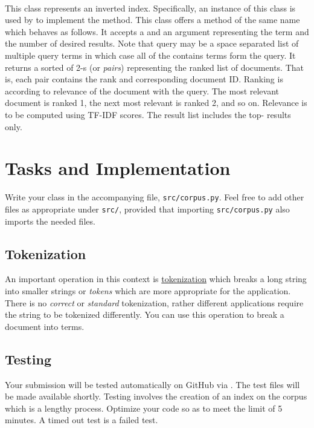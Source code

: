 \documentclass[addpoints]{exam}
\begin{document}
\paragraph{} This class represents an inverted index. Specifically, an instance of this class is used by  to implement the  method. This class offers a method of the same name which behaves as follows. It accepts a  and an  argument representing the  term and the number of desired results. Note that query may be a space separated list of multiple query terms in which case all of the contains terms form the query. It returns a sorted  of 2-s (or \textit{pairs}) representing the ranked list of documents. That is, each pair contains the rank and corresponding document ID. Ranking is according to relevance of the document with the query. The most relevant document is ranked 1, the next most relevant is ranked 2, and so on. Relevance is to be computed using TF-IDF scores. The result list includes the top- results only.


\section{Tasks and Implementation}

Write your  class in the accompanying file, \texttt{src/corpus.py}. Feel free to add other files as appropriate under \texttt{src/}, provided that importing \texttt{src/corpus.py} also imports the needed files.

\subsection{Tokenization}

An important operation in this context is \href{https://nlp.stanford.edu/IR-book/html/htmledition/tokenization-1.html}{tokenization} which breaks a long string into smaller strings or \textit{tokens} which are more appropriate for the application. There is no \textit{correct} or \textit{standard} tokenization, rather different applications require the string to be tokenized differently. You can use this operation to break a document into terms.

\subsection{Testing}

Your submission will be tested automatically on GitHub via . The test files will be made available shortly. Testing involves the creation of an index on the corpus which is a lengthy process. Optimize your code so as to meet the  limit of 5 minutes. A timed out test is a failed test.
\end{document}
